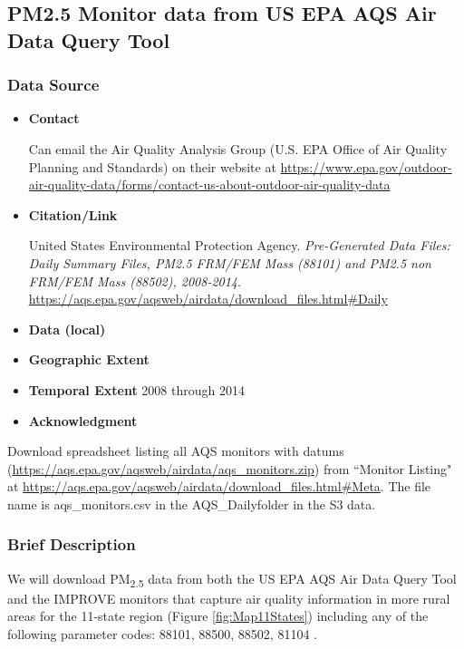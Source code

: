 \subsection{PM2.5 Monitor data from US EPA AQS Air Data Query Tool}

\subsubsection*{Data Source}

\begin{itemize}[nolistsep]
\item \textbf{Contact}

Can email the Air Quality Analysis Group (U.S. EPA Office of Air Quality Planning and Standards) on their website at \url{https://www.epa.gov/outdoor-air-quality-data/forms/contact-us-about-outdoor-air-quality-data}


\item \textbf{Citation/Link}

United States Environmental Protection Agency. \textit{Pre-Generated Data Files: Daily Summary Files, PM2.5 FRM/FEM Mass (88101) and PM2.5 non FRM/FEM Mass (88502), 2008-2014}. \url{https://aqs.epa.gov/aqsweb/airdata/download_files.html#Daily} 
\item \textbf{Data (local)}
\item \textbf{Geographic Extent}
\item \textbf{Temporal Extent}
2008 through 2014
\item \textbf{Acknowledgment}
\end{itemize}

Download spreadsheet listing all AQS monitors with datums (\url{https://aqs.epa.gov/aqsweb/airdata/aqs_monitors.zip}) from ``Monitor Listing" at \url{https://aqs.epa.gov/aqsweb/airdata/download_files.html#Meta}. The file name is aqs\_monitors.csv in the AQS\_Daily\Summaries folder in the S3 data.

\subsubsection*{Brief Description}

We will download PM\textsubscript{2.5} data from both the US EPA AQS Air Data Query Tool \citep{EPAAirData2017} and the IMPROVE monitors that capture air quality information in 
more rural areas \citep{EPANPM25IMPROVE2017} for the 11-state region (Figure \ref{fig:Map11States}) including any of the following parameter codes: 88101, 88500, 88502, 81104 \citep{EPANPM25Memo2017,EPANPM25Parameters2017,EPANAllParameters2017}. %

